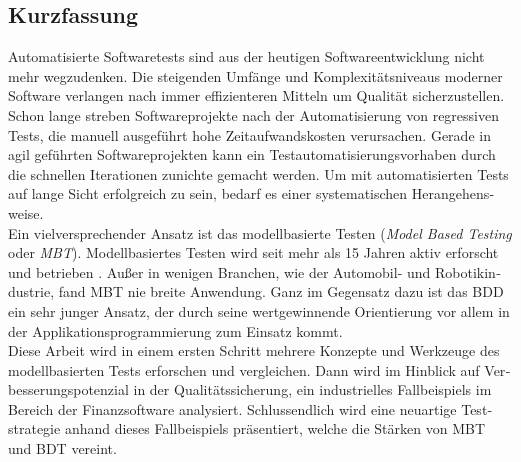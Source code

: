 
\cleardoublepage
{}


%

\begin{otherlanguage}{ngerman}

\chapter*{Kurzfassung}

Automatisierte Softwaretests sind aus der heutigen Softwareentwicklung nicht mehr wegzudenken. Die steigenden Umfänge und Komplexitätsniveaus moderner Software verlangen nach immer effizienteren Mitteln um Qualität sicherzustellen. Schon lange streben Softwareprojekte nach der Automatisierung von regressiven Tests, die manuell ausgeführt hohe Zeitaufwandskosten verursachen. Gerade in agil geführten Softwareprojekten kann ein Testautomatisierungsvorhaben durch die schnellen Iterationen zunichte gemacht werden. Um mit automatisierten Tests auf lange Sicht erfolgreich zu sein, bedarf es einer systematischen Herangehensweise.\\

Ein vielversprechender Ansatz ist das modellbasierte Testen (\textit{Model Based Testing} oder \textit{MBT}). Modellbasiertes Testen wird seit mehr als 15 Jahren aktiv erforscht und betrieben \cite{utting_practical_2007}. Außer in wenigen Branchen, wie der Automobil- und Robotikindustrie, fand \Gls{MBT} nie breite Anwendung. Ganz im Gegensatz dazu ist das \Gls{BDD} ein sehr junger Ansatz, der durch seine wertgewinnende Orientierung vor allem in der Applikationsprogrammierung zum Einsatz kommt.\\

Diese Arbeit wird in einem ersten Schritt mehrere Konzepte und Werkzeuge des modellbasierten Tests erforschen und vergleichen. Dann wird im Hinblick auf Verbesserungspotenzial in der Qualitätssicherung, ein industrielles Fallbeispiels im Bereich der Finanzsoftware analysiert. Schlussendlich wird eine neuartige Teststrategie anhand dieses Fallbeispiels präsentiert, welche die Stärken von \Gls{MBT} und \Gls{BDT} vereint. \\


\end{otherlanguage}
